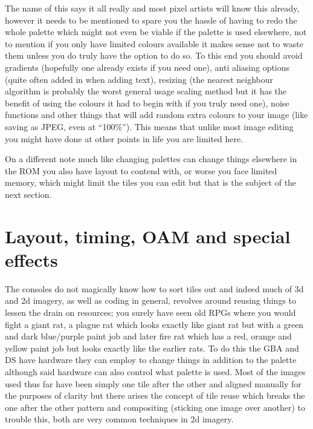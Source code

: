 \documentclass[
]{book}
\begin{document}
The name of this says it all really and most pixel artists will know this already, however it needs to be mentioned to spare you the hassle of having to redo the whole palette which might not even be viable if the palette is used elsewhere, not to mention if you only have limited colours available it makes sense not to waste them unless you do truly have the option to do so. To this end you should avoid gradients (hopefully one already exists if you need one), anti aliasing options (quite often added in when adding text), resizing (the nearest neighbour algorithm is probably the worst general usage scaling method but it has the benefit of using the colours it had to begin with if you truly need one), noise functions and other things that will add random extra colours to your image (like saving as JPEG, even at ``100\%''). This means that unlike most image editing you might have done at other points in life you are limited here.

On a different note much like changing palettes can change things elsewhere in the ROM you also have layout to contend with, or worse you face limited memory, which might limit the tiles you can edit but that is the subject of the next section.

\hypertarget{layout-timing-oam-and-special-effects}{%
\section{Layout, timing, OAM and special effects}\label{layout-timing-oam-and-special-effects}}

The consoles do not magically know how to sort tiles out and indeed much of 3d and 2d imagery, as well as coding in general, revolves around reusing things to lessen the drain on resources; you surely have seen old RPGs where you would fight a giant rat, a plague rat which looks exactly like giant rat but with a green and dark blue/purple paint job and later fire rat which has a red, orange and yellow paint job but looks exactly like the earlier rats. To do this the GBA and DS have hardware they can employ to change things in addition to the palette although said hardware can also control what palette is used. Most of the images used thus far have been simply one tile after the other and aligned manually for the purposes of clarity but there arises the concept of tile reuse which breaks the one after the other pattern and compositing (sticking one image over another) to trouble this, both are very common techniques in 2d imagery.
\end{document}

